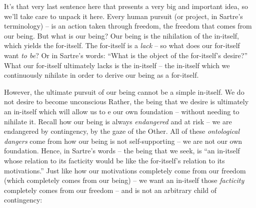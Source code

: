 It's that very last sentence here that presents a very big and important idea, so we'll take care to unpack it here. Every human pursuit (or project, in Sartre's terminology) -- is an action taken through freedom, the freedom that comes from our being. But what is our being? Our being is the nihilation of the in-itself, which yields the for-itself. The for-itself is a \emph{lack} -- so what does our for-itself want \emph{to be}? Or in Sartre's words: \enquote{What is the object of the for-itself's desire?} What our for-itself ultimately lacks is the in-itself -- the in-itself which we continuously nihilate in order to derive our being as a for-itself. 

However, the ultimate pursuit of our being cannot be a simple in-itself. We do not desire to become unconscious Rather, the being that we desire is ultimately an in-itself which will allow us to e our own foundation -- without needing to nihilate it. Recall how our being is always \emph{endangered} and at risk -- we are endangered by contingency, by the gaze of the Other. All of these \emph{ontological dangers} come from how our being is not self-supporting -- we are not our own foundation. Hence, in Sartre's words -- the being that we seek, is \enquote{an in-itself whose relation to its facticity would be like the for-itself's relation to its motivations.} Just like how our motivations completely come from our freedom (which completely comes from our being) -- we want an in-itself those \emph{facticity} completely comes from our freedom -- and is not an arbitrary child of contingency:

